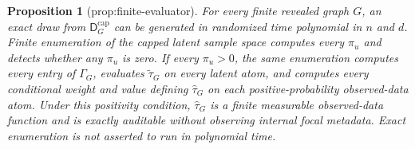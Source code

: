 \documentclass{article}
\newtheorem{proposition}{Proposition}
\begin{document}
\begin{proposition}[prop:finite-evaluator]\label{prop:finite-evaluator}
For every finite revealed graph \(G\), an exact draw from \(\mathsf D_G^{\mathrm{cap}}\) can be generated in randomized time polynomial in \(n\) and \(d\). Finite enumeration of the capped latent sample space computes every \(\pi_u\) and detects whether any \(\pi_u\) is zero. If every \(\pi_u>0\), the same enumeration computes every entry of \(\Gamma_G\), evaluates \(\widetilde\tau_G\) on every latent atom, and computes every conditional weight and value defining \(\widehat\tau_G\) on each positive-probability observed-data atom. Under this positivity condition, \(\widehat\tau_G\) is a finite measurable observed-data function and is exactly auditable without observing internal focal metadata. Exact enumeration is not asserted to run in polynomial time.
\end{proposition}
\end{document}
